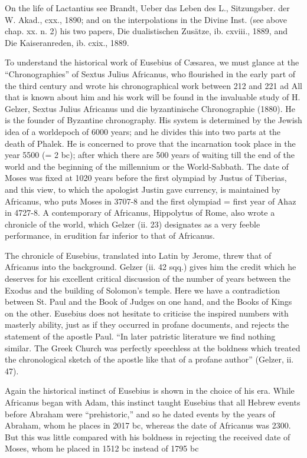 On the life of Lactantius see Brandt, Ueber das Leben des L., Sitzungsber. der W. Akad., cxx., 1890; and on the interpolations in the Divine Inst. (see above chap. xx. n. 2) his two papers, Die dualistischen Zusätze, ib. cxviii., 1889, and Die Kaiseranreden, ib. cxix., 1889.

To understand the historical work of Eusebius of Cæsarea, we must glance at the \texthebrew{“}Chronographies\texthebrew{}” of Sextus Julius Africanus, who flourished in the early part of the third century and wrote his chronographical work between 212 and 221 ad All that is known about him and his work will be found in the invaluable study of H. Gelzer, Sextus Julius Africanus und die byzantinische Chronographie (1880). He is the founder of Byzantine chronography. His system is determined by the Jewish idea of a worldepoch of 6000 years; and he divides this into two parts at the death of Phalek. He is concerned to prove that the incarnation took place in the year 5500 (= 2 bc); after which there are 500 years of waiting till the end of the world and the beginning of the millennium or the World-Sabbath. The date of Moses was fixed at 1020 years before the first olympiad by Justus of Tiberias, and this view, to which the apologist Justin gave currency, is maintained by Africanus, who puts Moses in 3707-8 and the first olympiad = first year of Ahaz in 4727-8. A contemporary of Africanus, Hippolytus of Rome, also wrote a chronicle of the world, which Gelzer (ii. 23) designates as a very feeble performance, in erudition far inferior to that of Africanus.

The chronicle of Eusebius, translated into Latin by Jerome, threw that of Africanus into the background. Gelzer (ii. 42 sqq.) gives him the credit which he deserves for his excellent critical discussion of the number of years between the Exodus and the building of Solomon\texthebrew{}’s temple. Here we have a contradiction between St. Paul and the Book of Judges on one hand, and the Books of Kings on the other. Eusebius does not hesitate to criticise the inspired numbers with masterly ability, just as if they occurred in profane documents, and rejects the statement of the apostle Paul. \texthebrew{“}In later patristic literature we find nothing similar. The Greek Church was perfectly speechless at the boldness which treated the chronological sketch of the apostle like that of a profane author\texthebrew{}” (Gelzer, ii. 47).

Again the historical instinct of Eusebius is shown in the choice of his era. While Africanus began with Adam, this instinct taught Eusebius that all Hebrew events before Abraham were \texthebrew{“}prehistoric,\texthebrew{}” and so he dated events by the years of Abraham, whom he places in 2017 bc, whereas the date of Africanus was 2300. But this was little compared with his boldness in rejecting the received date of Moses, whom he placed in 1512 bc instead of 1795 bc

